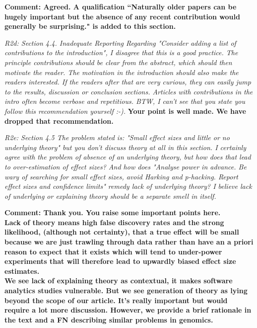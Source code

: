 {\bf Comment: Agreed.  A qualification ``Naturally older papers can be hugely important but the absence of any recent contribution would generally be surprising." is added to this section.}

{\em
R2d: Section 4.4. Inadequate Reporting
Regarding "Consider adding a list of contributions to the introduction", I disagree that this is a good practice. The principle contributions should be clear from the abstract, which should then motivate the reader. The motivation in the introduction should also make the readers interested. If the readers after that are very curious, they can easily jump to the results, discussion or conclusion sections. Articles with contributions in the intro often become verbose and repetitious. BTW, I can't see that you state you follow this recommendation yourself :-). 
}
 {\bf  Your point is well made. We have dropped that recommendation.}

{\em
R2e: 
Section 4.5
The problem stated is: "Small effect sizes and little or no underlying theory" but you don't discuss theory at all in this section.
I certainly agree with the problem of absence of an underlying theory, but how does that lead to over-estimation of effect sizes? And how does "Analyse power in advance. Be wary of searching for small effect sizes, avoid Harking and p-hacking. Report effect sizes and confidence limits" remedy lack of underlying theory? I believe lack of underlying or explaining theory should be a separate smell in itself. }

{\bf Comment: Thank you.  You raise some important points here.  \\
Lack of theory means high false discovery rates and the strong likelihood, (although not certainty), that a true effect will be small because we are just trawling through data rather than have an a priori reason to expect that it exists which will tend to under-power experiments that will therefore lead to upwardly biased effect size estimates.\\
We see lack of explaining theory as contextual, it makes software analytics studies vulnerable.  But we see generation of theory as lying beyond the scope of our article.  It's really important but would require a lot more discussion.
However, we provide a brief rationale in the text and a FN describing similar problems in genomics. 
}


